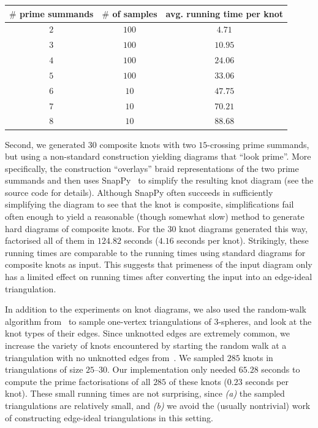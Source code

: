 \documentclass[a4paper,UKenglish,cleveref, autoref, thm-restate]{lipics-v2021}
\begin{document}
\begin{center}
\begin{tabular}{c|c|c}
  $\#$ prime summands & $\#$ of samples & avg. running time per knot \\%
  \hline
  \hline
  $2$ & $100$ & $4.71$ \\%
  \hline
  $3$ & $100$ & $10.95$  \\%
  \hline
  $4$ & $100$ & $24.06$ \\%
  \hline
  $5$ & $100$ & $33.06$ \\%
  \hline
  $6$ & $10$ & $47.75$ \\%
  \hline
  $7$ & $10$ & $70.21$ \\%
  \hline
  $8$ & $10$ & $88.68$ %
\end{tabular}
\end{center}

Second, we generated $30$ composite knots with two $15$-crossing prime summands, but using
a non-standard construction yielding diagrams that ``look prime''. More specifically, the
construction ``overlays'' braid representations of the two prime summands and then uses
SnapPy~\cite{SnapPy} to simplify the resulting knot diagram (see the source code for
details). Although SnapPy often succeeds in sufficiently simplifying the diagram to see
that the knot is composite, simplifications fail often enough to yield a reasonable
(though somewhat slow) method to generate hard diagrams of composite knots. For the $30$
knot diagrams generated this way,  factorised all of them in $124.82$
seconds ($4.16$ seconds per knot). Strikingly, these running times are comparable to the
running times using standard diagrams for composite knots as input. This suggests that
primeness of the input diagram only has a limited effect on running times after converting
the input into an edge-ideal triangulation.

In addition to the experiments on knot diagrams, we also used the random-walk algorithm
from~\cite{AltmannMCMC} to sample one-vertex triangulations of $3$-spheres, and look at
the knot types of their edges. Since unknotted edges are extremely common, we increase the
variety of knots encountered by starting the random walk at a triangulation with no
unknotted edges from~\cite{burton2023counterexamples}. We sampled $285$ knots in
triangulations of size $25$--$30$.
Our implementation only needed $65.28$ seconds to compute the prime factorisations of all $285$ of these knots ($0.23$ seconds per knot).
These
small running times are not surprising, since \emph{(a)} the sampled triangulations are
relatively small, and \emph{(b)} we avoid the (usually nontrivial) work of constructing
edge-ideal triangulations in this setting.
\end{document}
